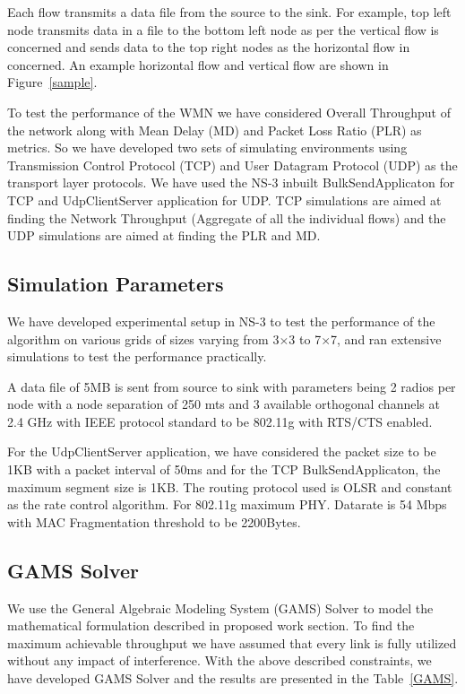 \documentclass[conference]{IEEEtran}
\begin{document}
Each flow transmits a data file from the source to the sink. 
For example, top left node transmits data in a file to the bottom left node as per the vertical flow is concerned and sends data to the top right nodes as the horizontal flow in concerned. 
An example horizontal flow and vertical flow are shown in Figure~\ref{sample}.

To test the performance of the WMN we have considered Overall Throughput of the network along with Mean Delay (MD) and Packet Loss Ratio (PLR) as metrics.
So we have developed two sets of simulating environments using Transmission Control Protocol (TCP) and User Datagram Protocol (UDP) as the transport layer protocols. 
We have used the NS-3 inbuilt BulkSendApplicaton for TCP and UdpClientServer application for UDP. 
TCP simulations are aimed at finding the Network Throughput (Aggregate of all the individual flows) and the UDP simulations are aimed at finding the PLR and MD.
 
 
 \subsection{Simulation Parameters}

We have developed experimental setup in NS-3 \cite{henderson2008network} to test the performance of the algorithm on various grids of sizes varying from 3$\times$3 to 7$\times$7,
and ran extensive simulations to test the performance practically.

A data file of 5MB is sent from source to sink with parameters being 2 radios per node with a node separation of 250 mts and 3 available orthogonal channels at 2.4 GHz with IEEE protocol standard
to be 802.11g with RTS/CTS enabled.

For the UdpClientServer application, we have considered the packet size to be 1KB with a packet interval of 50ms and for the TCP BulkSendApplicaton, the maximum segment size is 1KB.
The routing protocol used is OLSR and constant as the rate control algorithm. For 802.11g maximum PHY. Datarate is 54 Mbps with MAC Fragmentation threshold to be 2200Bytes.


\subsection{GAMS Solver}
We use the General Algebraic Modeling System (GAMS) \cite{gams} Solver to model the mathematical formulation described in proposed work section.
To find the maximum achievable throughput we have assumed that every link is fully utilized without any impact of interference.
With the above described constraints, we have developed GAMS Solver and the results are presented in the Table~\ref{GAMS}.
\end{document}
